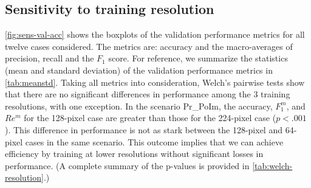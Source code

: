 \documentclass[NewProceedindgs, NoLineNumbers, SectionNumbers, letterpaper, SingleSpace, InsideFigs]{ascelike-new}
\begin{document}
\subsection{Sensitivity to training resolution}
\autoref{fig:sens-val-acc} shows the boxplots of the validation performance metrics for all twelve cases considered.
The metrics are: accuracy and the macro-averages of precision, recall and the $F_{1}$ score.
For reference, we summarize the statistics (mean and standard deviation) of the validation performance metrics in \autoref{tab:meanstd}.
Taking all metrics into consideration, Welch's pairwise tests show that there are no significant differences in performance among the 3 training resolutions, with one exception.
In the scenario Pr\_PoIm, the accuracy, $F_{1}^{m}$, and $Re^{m}$ for the 128-pixel case are greater than those for the 224-pixel case ($p<.001$).
This difference in performance is not as stark between the 128-pixel and 64-pixel cases in the same scenario.
This outcome implies that we can achieve efficiency by  training at lower resolutions without significant losses in performance.
(A complete summary of the p-values is provided in \autoref{tab:welch-resolution}.)
\end{document}
